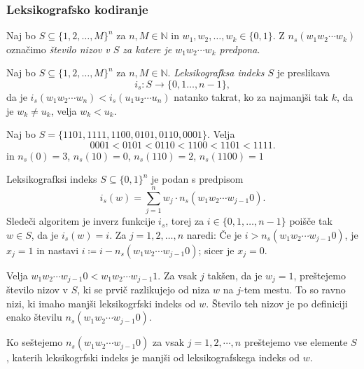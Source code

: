 \documentclass[fin1, tisk]{fmfdelo}
\newcommand{\N}{\mathbb{N}}
\theoremstyle{definition}
\begin{document}
\subsubsection{Leksikografsko kodiranje}%

\begin{definicija}
    Naj bo $S \subseteq \{ 1,2, \ldots, M\}^n$ za $n, M \in \N$ in 
    $w_1, w_2, \ldots, w_k \in \{ 0,1 \}$. Z $n_s(w_1w_2 \cdots w_k)$ označimo 
    \emph{število nizov v $S$ za katere je $w_1w_2 \cdots w_k$ predpona}.
\end{definicija}

\begin{definicija}
    Naj bo $S \subseteq \{ 1,2, \ldots, M\}^n$ za $n, M \in \N$. \emph{Leksikografksa indeks $S$}
    je preslikava
    \[
        i_s \colon S \to \{ 0,1 \ldots, n -1 \},
    \]
    da je $i_s(w_1w_2 \cdots w_n) < i_s(u_1u_2 \cdots u_n)$ natanko takrat, ko za najmanjši
    tak $k$, da je $w_k \neq u_k$, velja $w_k < u_k$.
\end{definicija}

\begin{primer}\label{primer:številčenje}
    Naj bo $S = \{ 1101, 1111, 1100, 0101, 0110, 0001 \}$. Velja
    \[
        0001 < 0101 < 0110 < 1100 < 1101 < 1111.
    \]
    in $n_s(0) = 3$, $n_s(10) = 0$, $n_s(110) = 2$, $n_s(1100) = 1$
\end{primer}

\begin{trditev}
    Leksikografksi indeks $S \subseteq \{ 0,1 \}^n$ je podan s predpisom
    \[
        i_s(w) = \sum_{j=1}^{n} w_j \cdot n_s(w_1w_2 \cdots w_{j-1}0).
    \]
    Sledeči algoritem je inverz funkcije $i_s$, torej za $i \in \{ 0, 1, \ldots, n - 1 \}$ 
    poišče tak $w \in S$, da je $i_s(w) = i$. Za $j = 1, 2, \ldots, n$ naredi: Če je 
    $i > n_s(w_1w_2 \cdots w_{j-1}0)$, je $x_j = 1$ in nastavi 
    $i \coloneq  i - n_s(w_1w_2 \cdots w_{j-1}0)$; sicer je $x_j = 0$.
\end{trditev}

\begin{dokaz}
    Velja $w_1w_2 \cdots w_{j-1}0 < w_1w_2 \cdots w_{j-1}1$. Za vsak $j$ takšen, da je $w_j=1$,
    preštejemo število nizov v $S$, ki se prvič razlikujejo od niza $w$ na $j$-tem mestu.
    To so ravno nizi, ki imaho manjši leksikogrfski indeks od $w$. Število teh nizov je po 
    definiciji enako številu $n_s(w_1w_2 \cdots w_{j-1}0)$.

    Ko seštejemo $n_s(w_1w_2 \cdots w_{j-1}0)$ za vsak $j = 1,2, \cdots, n$ preštejemo vse
    elemente $S$, katerih leksikogrfski indeks je manjši od leksikografskega indeks od $w$.
\end{dokaz}
\end{document}
